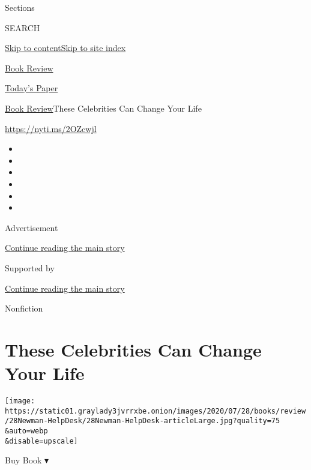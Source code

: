 Sections

SEARCH

\protect\hyperlink{site-content}{Skip to
content}\protect\hyperlink{site-index}{Skip to site index}

\href{https://www.nytimes3xbfgragh.onion/section/books/review}{Book
Review}

\href{https://myaccount.nytimes3xbfgragh.onion/auth/login?response_type=cookie\&client_id=vi}{}

\href{https://www.nytimes3xbfgragh.onion/section/todayspaper}{Today's
Paper}

\href{/section/books/review}{Book Review}\textbar{}These Celebrities Can
Change Your Life

\url{https://nyti.ms/2OZcwjl}

\begin{itemize}
\item
\item
\item
\item
\item
\item
\end{itemize}

Advertisement

\protect\hyperlink{after-top}{Continue reading the main story}

Supported by

\protect\hyperlink{after-sponsor}{Continue reading the main story}

Nonfiction

\hypertarget{these-celebrities-can-change-your-life}{%
\section{These Celebrities Can Change Your
Life}\label{these-celebrities-can-change-your-life}}

\texttt{[image: https://static01.graylady3jvrrxbe.onion/images/2020/07/28/books/review/28Newman-HelpDesk/28Newman-HelpDesk-articleLarge.jpg?quality=75\\\&auto=webp\\\&disable=upscale]}

Buy Book ▾

